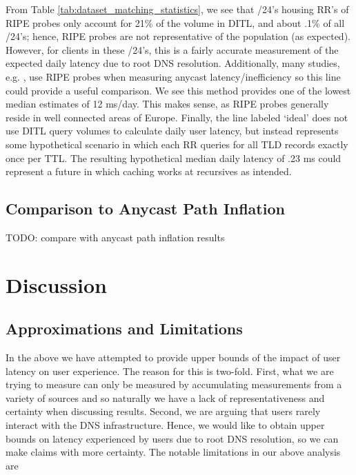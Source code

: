 \documentclass[sigconf,nonacm,10pt]{acmart}
\begin{document}
From Table \ref{tab:dataset_matching_statistics}, we see that /24's
housing RR's of RIPE probes only account for 21\% of the volume in DITL,
and about .1\% of all /24's; hence, RIPE probes are not representative
of the population (as expected). However, for clients in these /24's,
this is a fairly accurate measurement of the expected daily latency due
to root DNS resolution. Additionally, many studies, e.g.
\cite{li_levin_spring_bhattacharjee_2018}, use RIPE probes when
measuring anycast latency/inefficiency so this line could provide a
useful comparison. We see this method provides one of the lowest median
estimates of 12 ms/day. This makes sense, as RIPE probes generally
reside in well connected areas of Europe. \break \break
Finally, the line labeled `ideal' does not use DITL query volumes to
calculate daily user latency, but instead represents some hypothetical
scenario in which each RR queries for all TLD records exactly once per
TTL. The resulting hypothetical median daily latency of .23 ms could
represent a future in which caching works at recursives as intended.

\subsection{Comparison to Anycast Path
Inflation}\label{comparison-to-anycast-path-inflation}

\label{sec:rr_global_look_api} TODO: compare with anycast path inflation
results

\section{Discussion}\label{discussion}

\subsection{Approximations and
Limitations}\label{approximations-and-limitations}

\label{sec:discussion_approximations} In the above we have attempted to
provide upper bounds of the impact of user latency on user experience.
The reason for this is two-fold. First, what we are trying to measure
can only be measured by accumulating measurements from a variety of
sources and so naturally we have a lack of representativeness and
certainty when discussing results. Second, we are arguing that users
rarely interact with the DNS infrastructure. Hence, we would like to
obtain upper bounds on latency experienced by users due to root DNS
resolution, so we can make claims with more certainty. \break \break
The notable limitations in our above analysis are
\end{document}
